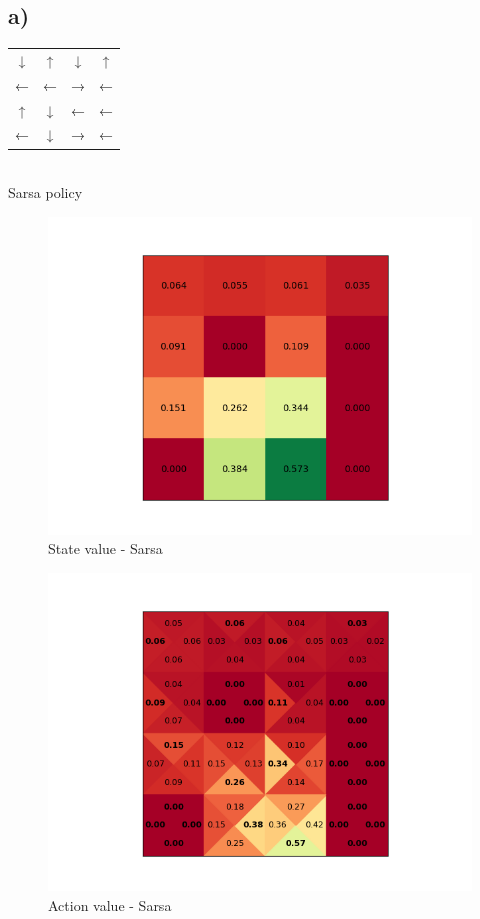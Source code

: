 \documentclass[a4paper]{article}
\begin{document}
    \subsection*{a)}
    \begin{center}
    	\begin{tabular}{ c c c c }
			↓ & ↑ & ↓ & ↑ \\ 
			← & ← & → & ← \\
			↑ & ↓ & ← & ← \\
			← & ↓ & → & ←   
    	\end{tabular} \\\vspace{10pt}
        	Sarsa policy 
    \end{center}
\begin{figure}[!ht]
	\centering
	\includegraphics[width=0.8\linewidth]{state_value_sarsa}
	\caption{State value -  Sarsa }
	\label{fig:state_value_sarsa}
\end{figure}
\begin{figure}[!ht]
	\centering
	\includegraphics[width=0.8\linewidth]{action_value_sarsa}
	\caption{Action value - Sarsa}
	\label{fig:action_value_sarsa}
\end{figure}
\end{document}
